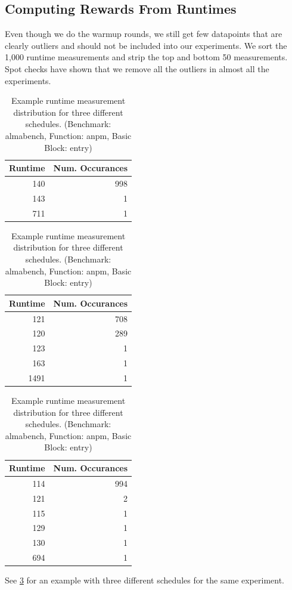 \subsection{Computing Rewards From Runtimes}
\tobechecked
Even though we do the warmup rounds, we still get few datapoints that are clearly outliers and should not be included into our experiments.
We sort the 1,000 runtime measurements and strip the top and bottom 50 measurements.
Spot checks have shown that we remove all the outliers in almost all the experiments.
\begin{table}
    \centering
    \begin{tabular}{@{}rr@{}}
        \toprule
        Runtime & Num. Occurances \\
        \midrule
        140 & 998 \\
        143 & 1 \\
        711 & 1 \\
        \bottomrule
    \end{tabular}
    \hspace{0.8cm}
    \begin{tabular}{@{}rr@{}}
        \toprule
        Runtime & Num. Occurances \\
        \midrule
        121 & 708 \\
        120 & 289 \\
        123 & 1 \\
        163 & 1 \\
        1491 & 1 \\
        \bottomrule
    \end{tabular}
    \hspace{0.8cm}
    \begin{tabular}{@{}rr@{}}
        \toprule
        Runtime & Num. Occurances \\
        \midrule
        114 & 994 \\
        121 & 2 \\
        115 & 1 \\
        129 & 1 \\
        130 & 1 \\
        694 & 1 \\
        \bottomrule
    \end{tabular}
    \caption[Example runtime measurement distribution]{Example runtime measurement distribution for three different schedules. (Benchmark: almabench, Function: anpm, Basic Block: entry)}
    \label{tab:approach:example_runtimes}
\end{table}
See \cref{tab:approach:example_runtimes} for an example with three different schedules for the same experiment.

